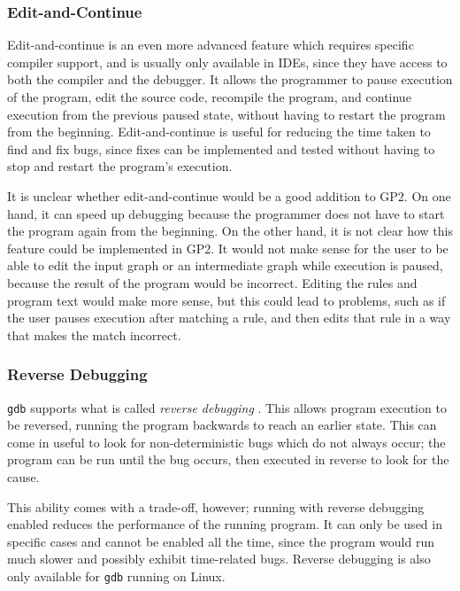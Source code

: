 \documentclass[authoryearcitations]{UoYCSproject}
\begin{document}

\subsubsection{Edit-and-Continue}
\label{sec:EditAndContinue}

Edit-and-continue is an even more advanced feature which requires specific
compiler support, and is usually only available in IDEs, since they have access
to both the compiler and the debugger. It allows the programmer to pause execution
of the program, edit the source code, recompile the program, and continue execution
from the previous paused state, without having to restart the program from the
beginning. Edit-and-continue is useful for reducing the time taken to find and
fix bugs, since fixes can be implemented and tested without having to stop and
restart the program's execution.

It is unclear whether edit-and-continue would be a good addition to GP2. On one
hand, it can speed up debugging because the programmer does not have to start the
program again from the beginning. On the other hand, it is not clear how this
feature could be implemented in GP2. It would not make sense for the user to be
able to edit the input graph or an intermediate graph while execution is paused,
because the result of the program would be incorrect. Editing the rules and
program text would make more sense, but this could lead to problems, such as if
the user pauses execution after matching a rule, and then edits that rule in
a way that makes the match incorrect.


\subsubsection{Reverse Debugging}
\label{sec:ReverseDebugging}

\texttt{gdb} supports what is called \emph{reverse debugging} \citep{gdbreversesite}.
This allows program execution to be reversed, running the program backwards to
reach an earlier state. This can come in useful to look for non-deterministic bugs
which do not always occur; the program can be run until the bug occurs, then
executed in reverse to look for the cause.

This ability comes with a trade-off, however; running with reverse debugging
enabled reduces the performance of the running program. It can only be used in
specific cases and cannot be enabled all the time, since the program would run
much slower and possibly exhibit time-related bugs. Reverse debugging is also
only available for \texttt{gdb} running on Linux.
\end{document}
